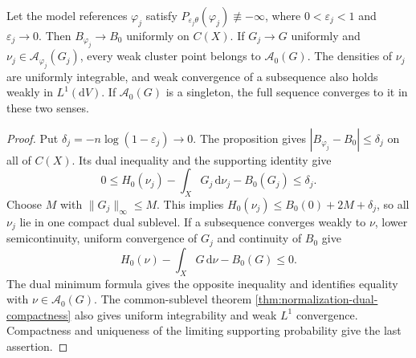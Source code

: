 \begin{corollary}\label{cor:small-reference-adjoint-limits}
Let the model references $\varphi_j$ satisfy $P_{\varepsilon_j\theta}(\varphi_j)\not\equiv-\infty$, where $0<\varepsilon_j<1$ and $\varepsilon_j\to0$. Then $B_{\varphi_j}\to B_0$ uniformly on $C(X)$. If $G_j\to G$ uniformly and $\nu_j\in\mathcal A_{\varphi_j}(G_j)$, every weak cluster point belongs to $\mathcal A_0(G)$. The densities of $\nu_j$ are uniformly integrable, and weak convergence of a subsequence also holds weakly in $L^1(\mathrm{d}V)$. If $\mathcal A_0(G)$ is a singleton, the full sequence converges to it in these two senses.
\end{corollary}
\begin{proof}
Put $\delta_j=-n\log(1-\varepsilon_j)\to0$. The proposition gives $|B_{\varphi_j}-B_0|\leq\delta_j$ on all of $C(X)$. Its dual inequality and the supporting identity give
\[
 0\leq H_0(\nu_j)-\int_XG_j\,\mathrm{d}\nu_j-B_0(G_j)
       \leq\delta_j.
\]
Choose $M$ with $\|G_j\|_\infty\leq M$. This implies $H_0(\nu_j)\leq B_0(0)+2M+\delta_j$, so all $\nu_j$ lie in one compact dual sublevel. If a subsequence converges weakly to $\nu$, lower semicontinuity, uniform convergence of $G_j$ and continuity of $B_0$ give
\[
 H_0(\nu)-\int_XG\,\mathrm{d}\nu-B_0(G)\leq0.
\]
The dual minimum formula gives the opposite inequality and identifies equality with $\nu\in\mathcal A_0(G)$. The common-sublevel theorem \cref{thm:normalization-dual-compactness} also gives uniform integrability and weak $L^1$ convergence. Compactness and uniqueness of the limiting supporting probability give the last assertion.
\end{proof}
